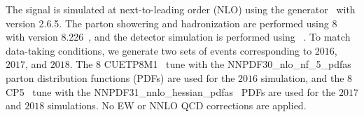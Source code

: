 The signal is simulated at next-to-leading order (NLO) using the \MGvATNLO generator~\cite{MGatNLO} with version 2.6.5. The parton showering and hadronization are performed using {\PYTHIA}8 with version 8.226~\cite{Sjostrand:2014zea}, and the detector simulation is performed using \GEANTfour~\cite{AGOSTINELLI2003250}. To match data-taking conditions, we generate two sets of events corresponding to $2016$, $2017$, and $2018$. The {\PYTHIA}8 CUETP8M1~\cite{Khachatryan:2015pea} tune with the NNPDF30\_nlo\_nf\_5\_pdfas~\cite{Ball_2015} parton distribution functions (PDFs) are used for the $2016$ simulation, and the {\PYTHIA}8 CP5~\cite{Sirunyan:2019dfx} tune with the NNPDF31\_nnlo\_hessian\_pdfas~\cite{collaboration2017parton} PDFs are used for the $2017$ and $2018$ simulations. No EW or NNLO QCD corrections are applied.

